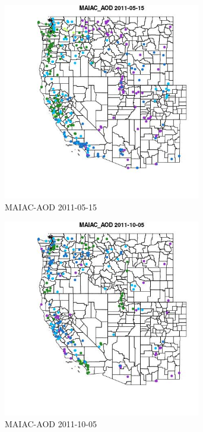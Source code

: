 \begin{figure} 
\centering  
\includegraphics[width=0.77\textwidth]{Code_Outputs/ML_input_report_ML_input_PM25_Step5_part_d_de_duplicated_aves_ML_input_MapObsMAIAC_AOD2011-05-15.jpg} 
\caption{\label{fig:ML_input_report_ML_input_PM25_Step5_part_d_de_duplicated_aves_ML_inputMapObsMAIAC_AOD2011-05-15}MAIAC-AOD 2011-05-15} 
\end{figure} 
 

\begin{figure} 
\centering  
\includegraphics[width=0.77\textwidth]{Code_Outputs/ML_input_report_ML_input_PM25_Step5_part_d_de_duplicated_aves_ML_input_MapObsMAIAC_AOD2011-10-05.jpg} 
\caption{\label{fig:ML_input_report_ML_input_PM25_Step5_part_d_de_duplicated_aves_ML_inputMapObsMAIAC_AOD2011-10-05}MAIAC-AOD 2011-10-05} 
\end{figure} 
 

